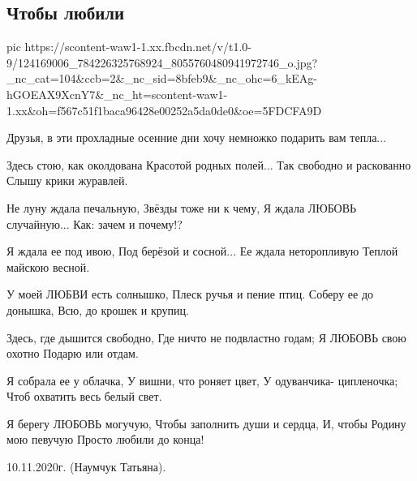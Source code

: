  
 
 

\subsection{Чтобы любили}
\label{sec:11_11_2020.fb.tanya_naumchuk.1.chtoby_ljubili}

\ifcmt
pic https://scontent-waw1-1.xx.fbcdn.net/v/t1.0-9/124169006_784226325768924_8055760480941972746_o.jpg?_nc_cat=104&ccb=2&_nc_sid=8bfeb9&_nc_ohc=6_kEAg-hGOEAX9XcnY7&_nc_ht=scontent-waw1-1.xx&oh=f567c51f1baca96428e00252a5da0de0&oe=5FDCFA9D
\fi

Друзья, в эти прохладные осенние дни хочу немножко подарить вам тепла... 

\begin{multicols}{2}
\obeycr
Здесь стою, как околдована
Красотой родных полей...
Так свободно и раскованно
Слышу крики журавлей.

Не луну ждала печальную,
Звёзды тоже ни к чему,
Я ждала ЛЮБОВЬ случайную...
Как: зачем и почему!?

Я ждала ее под ивою,
Под берёзой и сосной...
Ее ждала неторопливую
Теплой майскою весной.

У моей ЛЮБВИ есть солнышко,
Плеск ручья и пение птиц.
Соберу ее до донышка,
Всю, до крошек и крупиц.

Здесь, где дышится свободно,
Где ничто не подвластно годам;
Я ЛЮБОВЬ свою охотно
Подарю или отдам.

Я собрала ее у облачка,
У вишни, что роняет цвет,
У одуванчика- ципленочка;
Чтоб охватить весь белый свет.

Я берегу ЛЮБОВЬ могучую,
Чтобы заполнить души и сердца,
И, чтобы Родину мою певучую
Просто любили до конца!

10.11.2020г. (Наумчук Татьяна).
\restorecr
\end{multicols}
